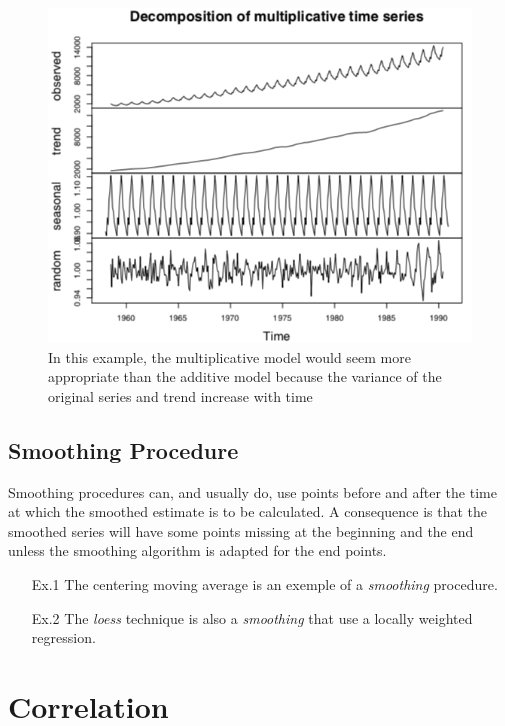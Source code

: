 \begin{figure}[!ht]
    \centering 
    \includegraphics[scale=0.6]{src/SerieChronologique/DecompositionMultiTimeSerie.png}
    \caption{In this example, the multiplicative model would seem more appropriate than the additive model because the variance of the original series and trend increase with time} 
\end{figure}

\subsection{Smoothing Procedure}
Smoothing procedures can, and usually do, use points before and after the time at which the smoothed estimate is to be calculated. A consequence is that the smoothed series will have some points missing at the beginning and the end unless the smoothing algorithm is adapted for the end points.
\begin{itemize}
    \item[Ex.1] The centering moving average is an exemple of a \emph{smoothing} procedure. 
    \item[Ex.2] The \emph{loess} technique is also a \emph{smoothing} that use a locally weighted regression.

\end{itemize}

\section{Correlation}

